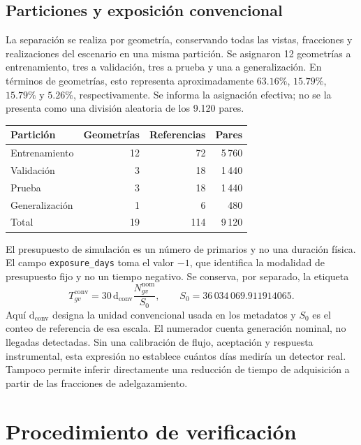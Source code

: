 \documentclass[11pt,a4paper]{article}
\begin{document}
\subsection{Particiones y exposición convencional}

La separación se realiza por geometría, conservando todas las vistas, fracciones y realizaciones del escenario en una misma partición. Se asignaron 12 geometrías a entrenamiento, tres a validación, tres a prueba y una a generalización. En términos de geometrías, esto representa aproximadamente $63.16\%$, $15.79\%$, $15.79\%$ y $5.26\%$, respectivamente. Se informa la asignación efectiva; no se la presenta como una división aleatoria de los 9.120 pares.

\begin{center}
\begin{tabular}{lrrr}
\toprule Partición & Geometrías & Referencias & Pares\\\midrule
Entrenamiento &12&72&5\,760\\
Validación &3&18&1\,440\\
Prueba &3&18&1\,440\\
Generalización &1&6&480\\\midrule
Total &19&114&9\,120\\\bottomrule
\end{tabular}
\end{center}

El presupuesto de simulación es un número de primarios y no una duración física. El campo \texttt{exposure\_days} toma el valor $-1$, que identifica la modalidad de presupuesto fijo y no un tiempo negativo. Se conserva, por separado, la etiqueta
\begin{equation}
 T^{\mathrm{conv}}_{gv}=30\,\mathrm{d}_{\mathrm{conv}}
 \frac{N^{\mathrm{nom}}_{gv}}{S_0},\qquad
 S_0=36\,034\,069.911914065.
 \label{eq:exposicion}
\end{equation}
Aquí $\mathrm{d}_{\mathrm{conv}}$ designa la unidad convencional usada en los metadatos y $S_0$ es el conteo de referencia de esa escala. El numerador cuenta generación nominal, no llegadas detectadas. Sin una calibración de flujo, aceptación y respuesta instrumental, esta expresión no establece cuántos días mediría un detector real. Tampoco permite inferir directamente una reducción de tiempo de adquisición a partir de las fracciones de adelgazamiento.

\section{Procedimiento de verificación}
\end{document}
